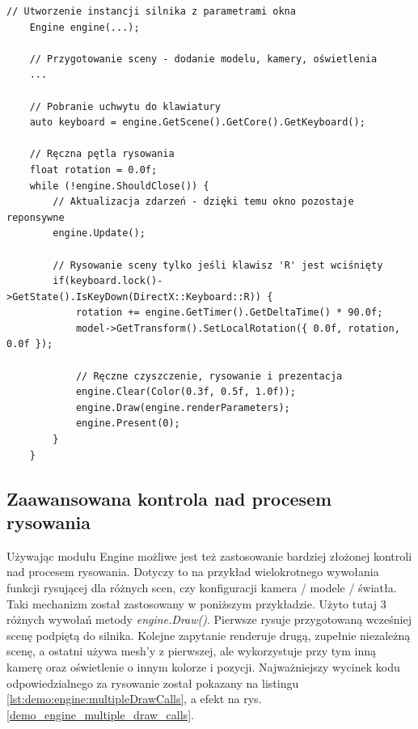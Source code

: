 \begin{lstlisting}[caption={Kod przykładowego programu manualnej kontroli przepływu działania programu w module silnika.}, label={lst:demo:engine:manualDrawingLoop}]
	// Utworzenie instancji silnika z parametrami okna
	Engine engine(...);
	
	// Przygotowanie sceny - dodanie modelu, kamery, oświetlenia
	...
	
	// Pobranie uchwytu do klawiatury
	auto keyboard = engine.GetScene().GetCore().GetKeyboard();
	
	// Ręczna pętla rysowania
	float rotation = 0.0f;
	while (!engine.ShouldClose()) {
		// Aktualizacja zdarzeń - dzięki temu okno pozostaje reponsywne
		engine.Update();
		
		// Rysowanie sceny tylko jeśli klawisz 'R' jest wciśnięty
		if(keyboard.lock()->GetState().IsKeyDown(DirectX::Keyboard::R)) {
			rotation += engine.GetTimer().GetDeltaTime() * 90.0f;
			model->GetTransform().SetLocalRotation({ 0.0f, rotation, 0.0f });
			
			// Ręczne czyszczenie, rysowanie i prezentacja
			engine.Clear(Color(0.3f, 0.5f, 1.0f));
			engine.Draw(engine.renderParameters);
			engine.Present(0);
		}
	}
\end{lstlisting}

\subsection{Zaawansowana kontrola nad procesem rysowania}
Używając modułu Engine możliwe jest też zastosowanie bardziej złożonej kontroli nad procesem rysowania. Dotyczy to na przykład wielokrotnego wywołania funkcji rysującej dla różnych scen, czy konfiguracji kamera / modele / światła. Taki mechanizm został zastosowany w poniższym przykładzie. Użyto tutaj 3 różnych wywołań metody \textit{engine.Draw()}. Pierwsze rysuje przygotowaną wcześniej scenę podpiętą do silnika. Kolejne zapytanie renderuje drugą, zupełnie niezależną scenę, a ostatni używa mesh'y z pierwszej, ale wykorzystuje przy tym inną kamerę oraz oświetlenie o innym kolorze i pozycji. Najważniejszy wycinek kodu odpowiedzialnego za rysowanie został pokazany na listingu \ref{lst:demo:engine:multipleDrawCalls}, a efekt na rys. \ref{demo_engine_multiple_draw_calls}.

\vfill
\clearpage

